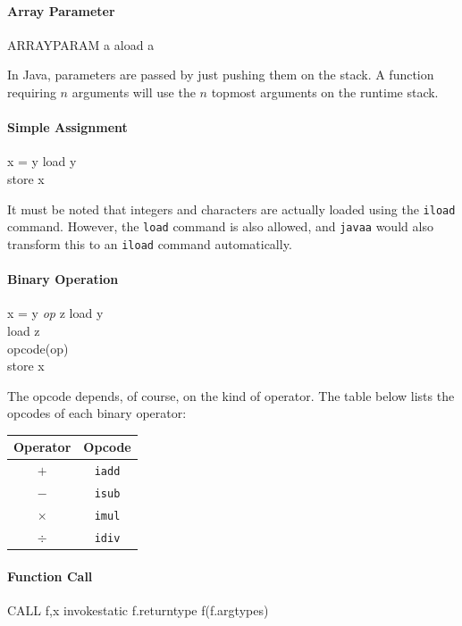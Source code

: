 \documentclass[a4paper]{article}
\begin{document}
\paragraph{Array Parameter\\}
\translate
{ARRAYPARAM a}
{aload a}

In Java, parameters are passed by just pushing them on the stack. A function
requiring $n$ arguments will use the $n$ topmost arguments on the runtime
stack.

\paragraph{Simple Assignment\\}
\translate
{x = y}
{
load y\\
store x
}

It must be noted that integers and characters are actually loaded using the
\texttt{iload} command. However, the \texttt{load} command is also allowed,
and \texttt{javaa} would also transform this to an \texttt{iload} command
automatically.

\paragraph{Binary Operation\\}
\translate
{x = y \textsl{op} z}
{
load y\\
load z\\
opcode(op)\\
store x
}

The opcode depends, of course, on the kind of operator. The table below lists
the opcodes of each binary operator:
\begin{center}
\begin{tabular}{|c|c|}
\hline
Operator & Opcode \\
\hline
$+$ & \texttt{iadd} \\
$-$ & \texttt{isub} \\
$\times$ & \texttt{imul} \\
$\div$ & \texttt{idiv} \\
\hline
\end{tabular}
\end{center}

\paragraph{Function Call\\}
\translate
{CALL f,x}
{invokestatic f.returntype f(f.argtypes)}
\end{document}
